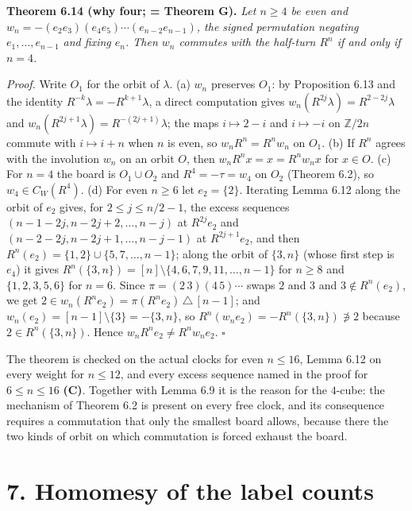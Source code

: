 \documentclass[
]{article}
\begin{document}
\textbf{Theorem 6.14 (why four; = Theorem G).} \emph{Let \(n \ge 4\) be
even and \(w_n = -(e_2e_3)(e_4e_5)\cdots(e_{n-2}e_{n-1})\), the signed
permutation negating \(e_1, \dots, e_{n-1}\) and fixing \(e_n\). Then
\(w_n\) commutes with the half-turn \(R^n\) if and only if \(n = 4\).}

\emph{Proof.} Write \(O_1\) for the orbit of \(\lambda\). (a) \(w_n\)
preserves \(O_1\): by Proposition 6.13 and the identity
\(R^{-k}\lambda = -R^{k+1}\lambda\), a direct computation gives
\(w_n(R^{2j}\lambda) = R^{2-2j}\lambda\) and
\(w_n(R^{2j+1}\lambda) = R^{-(2j+1)}\lambda\); the maps
\(i \mapsto 2 - i\) and \(i \mapsto -i\) on \(\mathbb{Z}/2n\) commute
with \(i \mapsto i + n\) when \(n\) is even, so \(w_n R^n = R^n w_n\) on
\(O_1\). (b) If \(R^n\) agrees with the involution \(w_n\) on an orbit
\(O\), then \(w_nR^nx = x = R^nw_nx\) for \(x \in O\). (c) For \(n = 4\)
the board is \(O_1 \cup O_2\) and \(R^4 = -\tau = w_4\) on \(O_2\)
(Theorem 6.2), so \(w_4 \in C_W(R^4)\). (d) For even \(n \ge 6\) let
\(e_2 = \{2\}\). Iterating Lemma 6.12 along the orbit of \(e_2\) gives,
for \(2 \le j \le n/2 - 1\), the excess sequences
\((n-1-2j, n-2j+2, \dots, n-j)\) at \(R^{2j}e_2\) and
\((n-2-2j, n-2j+1, \dots, n-j-1)\) at \(R^{2j+1}e_2\), and then
\(R^n(e_2) = \{1, 2\} \cup \{5, 7, \dots, n-1\}\); along the orbit of
\(\{3, n\}\) (whose first step is \(e_4\)) it gives
\(R^n(\{3, n\}) = [n] \setminus \{4, 6, 7, 9, 11, \dots, n-1\}\) for
\(n \ge 8\) and \(\{1, 2, 3, 5, 6\}\) for \(n = 6\). Since
\(\pi = (2\,3)(4\,5)\cdots\) swaps \(2\) and \(3\) and
\(3 \notin R^n(e_2)\), we get
\(2 \in w_n(R^n e_2) = \pi(R^ne_2)\,\triangle\,[n-1]\); and
\(w_n(e_2) = [n-1] \setminus \{3\} = -\{3, n\}\), so
\(R^n(w_n e_2) = -R^n(\{3, n\}) \not\ni 2\) because
\(2 \in R^n(\{3, n\})\). Hence \(w_nR^ne_2 \ne R^nw_ne_2\). \(\square\)

The theorem is checked on the actual clocks for even \(n \le 16\), Lemma
6.12 on every weight for \(n \le 12\), and every excess sequence named
in the proof for \(6 \le n \le 16\) \textbf{(C)}. Together with Lemma
6.9 it is the reason for the \(4\)-cube: the mechanism of Theorem 6.2 is
present on every free clock, and its consequence requires a commutation
that only the smallest board allows, because there the two kinds of
orbit on which commutation is forced exhaust the board.

\section{7. Homomesy of the label
counts}\label{homomesy-of-the-label-counts}
\end{document}
